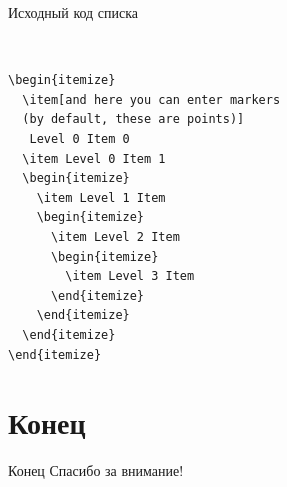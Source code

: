 \documentclass{beamer}[aspectratio=169]
\begin{document}
\begin{frame}[fragile]{Исходный код списка}
\begin{adjustbox}{scale=0.7}
\begin{large}
\transwipe
\
 \begin{lstlisting}[language=Tex]
 \begin{itemize}
  \item[and here you can enter markers
  (by default, these are points)]
   Level 0 Item 0 
  \item Level 0 Item 1 
  \begin{itemize}
    \item Level 1 Item
    \begin{itemize}
      \item Level 2 Item
      \begin{itemize}
        \item Level 3 Item
      \end{itemize}
    \end{itemize}
  \end{itemize}
\end{itemize}
\end{lstlisting}
\end{large}
\end{adjustbox}
\end{frame}
\section{Конец}
\begin{frame}{Конец}
\centering
\huge
Спасибо за внимание!

\end{frame}
\end{document}
